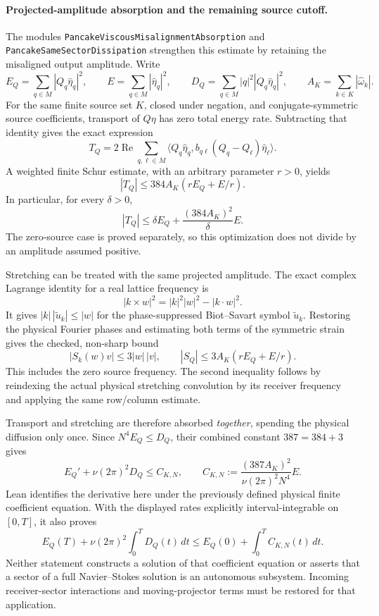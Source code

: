 \documentclass[11pt]{article}
\theoremstyle{definition}
\begin{document}
\paragraph{Projected-amplitude absorption and the remaining source cutoff.}
The modules \texttt{PancakeViscousMisalignmentAbsorption} and
\texttt{PancakeSameSectorDissipation} strengthen this estimate by retaining
the misaligned output amplitude.  Write
\[
 E_Q=\sum_{q\in M}|Q_q\widehat\eta_q|^2,\qquad
 E=\sum_{q\in M}|\widehat\eta_q|^2,\qquad
 D_Q=\sum_{q\in M}|q|^2|Q_q\widehat\eta_q|^2,\qquad
 A_K=\sum_{k\in K}|\widehat\omega_k|.
\]
For the same finite source set $K$, closed under negation, and
conjugate-symmetric source coefficients, transport of $Q\eta$ has zero
total energy rate.  Subtracting that identity gives the exact expression
\[
 T_Q=2\operatorname{Re}\sum_{q,\ell\in M}
   \langle Q_q\widehat\eta_q,
       b_{q\ell}(Q_q-Q_\ell)\widehat\eta_\ell\rangle.
\]
A weighted finite Schur estimate, with an arbitrary parameter $r>0$, yields
\[
 |T_Q|\le384A_K(rE_Q+E/r).
\]
In particular, for every $\delta>0$,
\[
 |T_Q|\le\delta E_Q+\frac{(384A_K)^2}{\delta}E.
\]
The zero-source case is proved separately, so this optimization does not
divide by an amplitude assumed positive.

Stretching can be treated with the same projected amplitude.  The exact
complex Lagrange identity for a real lattice frequency is
\[
 |k\mathbin\times w|^2=|k|^2|w|^2-|k\mathbin\cdot w|^2.
\]
It gives $|k|\,|\widetilde u_k|\le|w|$ for the phase-suppressed
Biot--Savart symbol $\widetilde u_k$.  Restoring the physical Fourier
phases and estimating both terms of the symmetric strain gives the
checked, non-sharp bound
\[
 |S_k(w)v|\le3|w|\,|v|,
 \qquad |S_Q|\le3A_K(rE_Q+E/r).
\]
This includes the zero source frequency.  The second inequality follows
by reindexing the actual physical stretching convolution by its receiver
frequency and applying the same row/column estimate.

Transport and stretching are therefore absorbed \emph{together}, spending
the physical diffusion only once.  Since $N^4E_Q\le D_Q$, their combined
constant $387=384+3$ gives
\begin{equation}\label{eq:ns-same-sector-absorption}
 E_Q'+\nu(2\pi)^2D_Q\le C_{K,N},
 \qquad C_{K,N}:=\frac{(387A_K)^2}{\nu(2\pi)^2N^4}E.
\end{equation}
Lean identifies the derivative here under the previously defined physical
finite coefficient equation.  With the displayed rates explicitly
interval-integrable on $[0,T]$, it also proves
\[
 E_Q(T)+\nu(2\pi)^2\int_0^T D_Q(t)\,dt
 \le E_Q(0)+\int_0^T C_{K,N}(t)\,dt.
\]
Neither statement constructs a solution of that coefficient equation or
asserts that a sector of a full Navier--Stokes solution is an autonomous
subsystem.  Incoming receiver-sector interactions and moving-projector
terms must be restored for that application.
\end{document}
